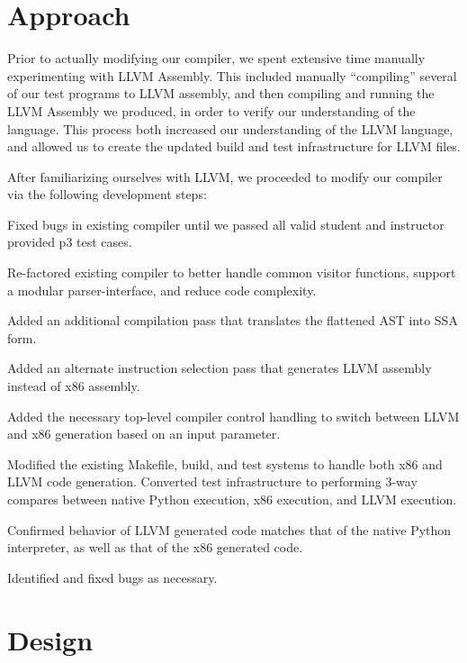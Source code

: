 \documentclass[11pt,twocolumn]{article}
\newenvironment{packed_enum}{
\begin{enumerate}
  \setlength{\itemsep}{1pt}
  \setlength{\parskip}{0pt}
  \setlength{\parsep}{0pt}
}{\end{enumerate}}
\begin{document}
\section{Approach}

Prior to actually modifying our compiler, we spent extensive time
manually experimenting with LLVM Assembly. This included manually
``compiling'' several of our test programs to LLVM assembly, and then
compiling and running the LLVM Assembly we produced, in order to
verify our understanding of the language. This process both increased
our understanding of the LLVM language, and allowed us to create the
updated build and test infrastructure for LLVM files.

After familiarizing ourselves with LLVM, we proceeded to modify our
compiler via the following development steps:

\begin{packed_enum}
\item Fixed bugs in existing compiler until we passed all valid student
  and instructor provided p3 test cases.
\item Re-factored existing compiler to better handle common visitor
  functions, support a modular parser-interface, and reduce code
  complexity.
\item Added an additional compilation pass that translates the flattened
  AST into SSA form.
\item Added an alternate instruction selection pass that generates LLVM
  assembly instead of x86 assembly.
\item Added the necessary top-level compiler control handling to switch
  between LLVM and x86 generation based on an input parameter.
\item Modified the existing Makefile, build, and test systems to handle
  both x86 and LLVM code generation. Converted test infrastructure to
  performing 3-way compares between native Python execution, x86
  execution, and LLVM execution.
\item Confirmed behavior of LLVM generated code matches that of the
  native Python interpreter, as well as that of the x86 generated
  code.
\item Identified and fixed bugs as necessary.
\end{packed_enum}

\section{Design}
\label{sec:design}
\end{document}
